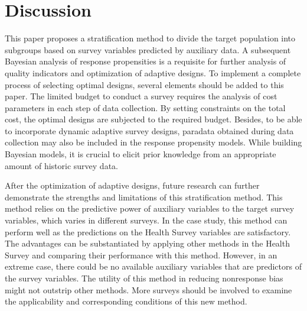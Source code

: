 \documentclass[11pt]{article}
\begin{document}
\section{Discussion}
\label{sec:Discussion}

This paper proposes a stratification method to divide the target population into subgroups based on survey variables predicted by auxiliary data. 
A subsequent Bayesian analysis of response propensities is a requisite for further analysis of quality indicators and optimization of adaptive designs. 
To implement a complete process of selecting optimal designs, several elements should be added to this paper. 
The limited budget to conduct a survey requires the analysis of cost parameters in each step of data collection. 
By setting constraints on the total cost, the optimal designs are subjected to the required budget. 
Besides, to be able to incorporate dynamic adaptive survey designs, paradata obtained during data collection may also be included in the response propensity models.
While building Bayesian models, it is crucial to elicit prior knowledge from an appropriate amount of historic survey data.

After the optimization of adaptive designs, future research can further demonstrate the strengths and limitations of this stratification method.
This method relies on the predictive power of auxiliary variables to the target survey variables, which varies in different surveys. 
In the case study, this method can perform well as the predictions on the Health Survey variables are satisfactory.
The advantages can be substantiated by applying other methods in the Health Survey and comparing their performance with this method.
However, in an extreme case, there could be no available auxiliary variables that are predictors of the survey variables.
The utility of this method in reducing nonresponse bias might not outstrip other methods. More surveys should be involved to examine the applicability and corresponding conditions of this new method. 






\newpage


\end{document}

